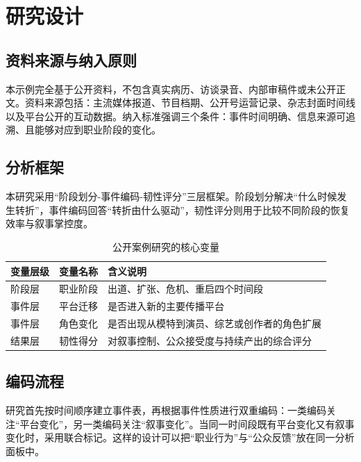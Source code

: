 \chapter{研究设计}

\section{资料来源与纳入原则}

本示例完全基于公开资料，不包含真实病历、访谈录音、内部审稿件或未公开正文。资料来源包括：主流媒体报道、节目档期、公开号运营记录、杂志封面时间线以及平台公开的互动数据。纳入标准强调三个条件：事件时间明确、信息来源可追溯、且能够对应到职业阶段的变化。

\section{分析框架}

本研究采用“阶段划分-事件编码-韧性评分”三层框架。阶段划分解决“什么时候发生转折”，事件编码回答“转折由什么驱动”，韧性评分则用于比较不同阶段的恢复效率与叙事掌控度。

\begin{table}[H]
  \centering
  \caption{公开案例研究的核心变量}
  \label{tab:smu-variables}
  \begin{tabularx}{0.92\textwidth}{>{\raggedright\arraybackslash}p{} >{\raggedright\arraybackslash}p{} X}
    \toprule
    变量层级 & 变量名称 & 含义说明 \\
    \midrule
    阶段层 & 职业阶段 & 出道、扩张、危机、重启四个时间段 \\
    事件层 & 平台迁移 & 是否进入新的主要传播平台 \\
    事件层 & 角色变化 & 是否出现从模特到演员、综艺或创作者的角色扩展 \\
    结果层 & 韧性得分 & 对叙事控制、公众接受度与持续产出的综合评分 \\
    \bottomrule
  \end{tabularx}
\end{table}

\section{编码流程}

研究首先按时间顺序建立事件表，再根据事件性质进行双重编码：一类编码关注“平台变化”，另一类编码关注“叙事变化”。当同一时间段既有平台变化又有叙事变化时，采用联合标记。这样的设计可以把“职业行为”与“公众反馈”放在同一分析面板中。

